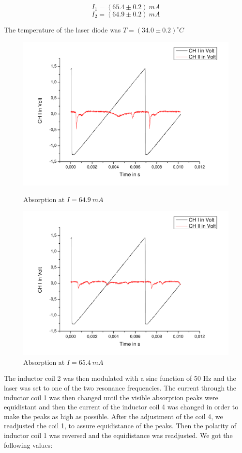 $$ I_1 = (65.4 \pm 0.2)\ mA $$
$$ I_2 = (64.9 \pm 0.2 )\ mA $$

The temperature of the laser diode was $T=(34.0 \pm 0.2)^\circ C$
 
\begin{figure}[H] 
\begin{minipage}{0.5\textwidth} 
\centering \includegraphics[width=\textwidth]{BilderAusw/DR_1.pdf}
\caption{Absorption at $I = 64.9\ mA$}
\end{minipage}
\begin{minipage}{0.5\textwidth} 
\centering \includegraphics[width=\textwidth]{BilderAusw/DR_2.pdf}
\caption{Absorption at $I = 65.4\ mA$}
\end{minipage}
\end{figure}

The inductor coil 2 was then modulated with a sine function of 50 Hz and the laser was set to one of the two resonance frequencies. The current through the inductor coil 1 was then changed until the visible absorption peaks were equidistant and then the current of the inductor coil 4 was changed in order to make the peaks as high as possible. After the adjustment of the coil 4, we readjusted the coil 1, to assure equidistance of the peaks. Then the polarity of inductor coil 1 was reversed and the equidistance was readjusted. We got the following values:


